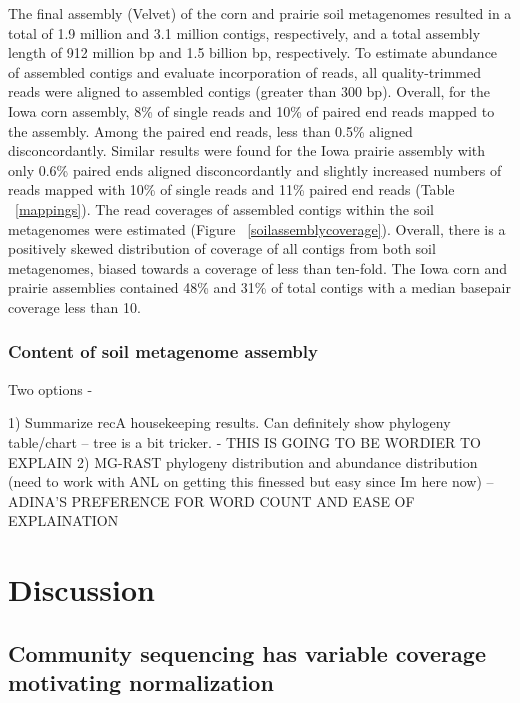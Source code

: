 \documentclass[11pt]{article} %
\begin{document}
The final assembly (Velvet) of the corn and prairie soil metagenomes resulted in a total of 1.9 million and 3.1 million contigs, respectively, and a total assembly length of 912 million bp and 1.5 billion bp, respectively.  To estimate abundance of assembled contigs and evaluate incorporation of reads, all quality-trimmed reads were aligned to assembled contigs (greater than 300 bp).  Overall, for the Iowa corn assembly, 8\% of single reads and 10\% of paired end reads mapped to the assembly.  Among the paired end reads, less than 0.5\% aligned disconcordantly.  Similar results were found for the Iowa prairie assembly with only 0.6\% paired ends aligned disconcordantly and slightly increased numbers of reads mapped with 10\% of single reads and 11\% paired end reads (Table ~\ref{mappings}).  The read coverages of assembled contigs within the soil metagenomes were estimated (Figure ~\ref{soilassemblycoverage}).  Overall, there is a positively skewed distribution of coverage of all contigs from both soil metagenomes, biased towards a coverage of less than ten-fold.  The Iowa corn and prairie assemblies contained 48\% and 31\% of total contigs with a median basepair coverage less than 10.  
	
\subsubsection{Content of soil metagenome assembly}

Two options - 

1) Summarize recA housekeeping results.  Can definitely show phylogeny table/chart -- tree is a bit tricker. - THIS IS GOING TO BE WORDIER TO EXPLAIN
2) MG-RAST phylogeny distribution and abundance distribution (need to work with ANL on getting this finessed but easy since Im here now) -- ADINA'S PREFERENCE FOR WORD COUNT AND EASE OF EXPLAINATION

\section{Discussion}

\subsection{Community sequencing has variable coverage motivating normalization} 
\end{document}
